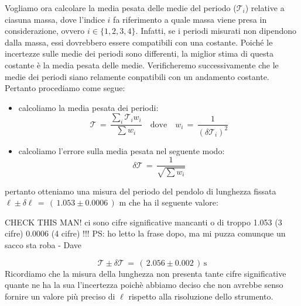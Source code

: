 Vogliamo ora calcolare la media pesata delle medie del periodo ($\mathcal{T}_i$) relative a ciasuna massa, dove l'indice $i$ fa riferimento a quale massa viene presa in considerazione, ovvero $i \in \{1,2,3,4\}$.
Infatti, se i periodi misurati non dipendono dalla massa, essi dovrebbero essere compatibili con una costante.
Poiché le incertezze sulle medie dei periodi sono differenti, la miglior stima di questa costante è la media pesata delle medie.
Verificheremo successivamente che le medie dei periodi siano relamente conpatibili con un andamento costante.
Pertanto procediamo come segue:

\begin{itemize}
	\item{calcoliamo la media pesata dei periodi:
			\begin{equation*}
				\mathcal{T} \,=\, \frac{\sum_i \mathcal{T}_i w_i}{\sum w_i} \quad \text{dove} \quad w_i \,=\, \frac{1}{(\delta \mathcal{T}_i)^2}
			\end{equation*}
			}
	\item{calcoliamo l'errore sulla media pesata nel seguente modo:
			\begin{equation*}
				\delta \mathcal{T} \,=\, \frac{1}{\sqrt{\sum w_i}}
			\end{equation*}
			}
\end{itemize}
pertanto otteniamo una misura del periodo del pendolo di lunghezza fissata $\ell \pm \delta \ell \,=\, (\,1.053 \pm 0.0006\,)$ m che ha il seguente valore:

CHECK THIS MAN! ci sono cifre significative mancanti o di troppo 1.053 (3 cifre) 0.0006 (4 cifre) !!! PS: ho letto la frase dopo, ma mi puzza comunque un sacco sta roba - Dave

\begin{equation*}
	\mathcal{T} \pm \delta \mathcal{T} \,=\, (\,2.056 \pm 0.002\,) \, \text{s}
\end{equation*}
%
Ricordiamo che la misura della lunghezza non presenta tante cifre significative quante ne ha la sua l'incertezza poichè abbiamo deciso che non avrebbe senso fornire un valore più preciso di $\ell$ rispetto alla risoluzione dello strumento.
